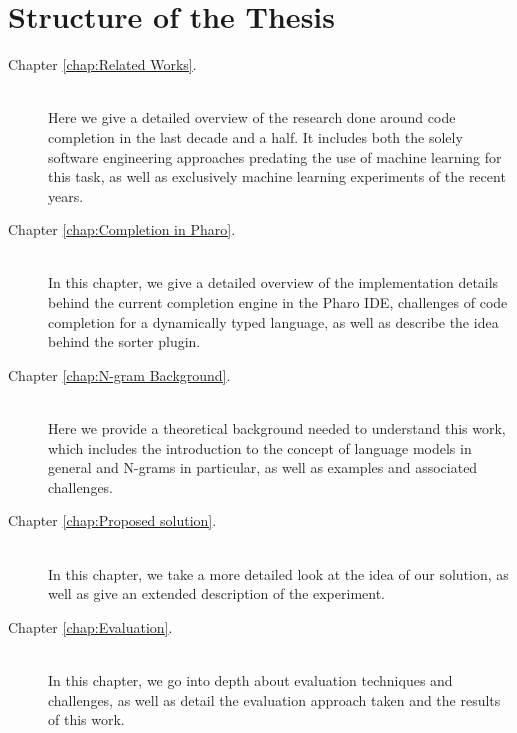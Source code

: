 \section{Structure of the Thesis}
\label{sec:Introduction-Structure}
{\hypersetup{linkcolor=black}
\begin{description}
	\item [Chapter \ref{chap:Related Works}. ] \hfill \\
	Here we give a detailed overview of the research done around code completion in the last decade and a half. It includes both the solely software engineering approaches predating the use of machine learning for this task, as well as exclusively machine learning experiments of the recent years.
	\item [Chapter \ref{chap:Completion in Pharo}. ] \hfill \\
	In this chapter, we give a detailed overview of the implementation details behind the current completion engine in the Pharo IDE, challenges of code completion for a dynamically typed language, as well as describe the idea behind the sorter plugin.
	\item [Chapter \ref{chap:N-gram Background}. ] \hfill \\
    Here we provide a theoretical background needed to understand this work, which includes the introduction to the concept of language models in general and N-grams in particular, as well as examples and associated challenges.
    \item [Chapter \ref{chap:Proposed solution}. ] \hfill \\
	In this chapter, we take a more detailed look at the idea of our solution, as well as give an extended description of the experiment.
	\item [Chapter \ref{chap:Evaluation}. ] \hfill \\
	In this chapter, we go into depth about evaluation techniques and challenges, as well as detail the evaluation approach taken and the results of this work.
\end{description}
}